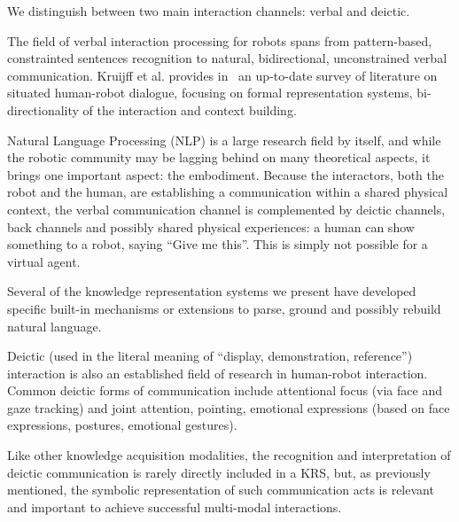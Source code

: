 We distinguish between two main interaction channels: verbal and deictic.

\begin{scriptsize}
\begin{center}
\end{center}
\end{scriptsize}

\label{sect|nlp}

The field of verbal interaction processing for robots spans from pattern-based,
constrainted sentences recognition to natural, bidirectional, unconstrained
verbal communication. Kruijff et al. provides in~\cite{Kruijff2010} an
up-to-date survey of literature on situated human-robot dialogue, focusing on
formal representation systems, bi-directionality of the interaction and context
building.

Natural Language Processing (NLP) is a large research field by itself, and
while the robotic community may be lagging behind on many theoretical aspects,
it brings one important aspect: the embodiment. Because the interactors, both
the robot and the human, are establishing a communication within a shared
physical context, the verbal communication channel is complemented by deictic
channels, back channels and possibly shared physical experiences: a human can
show something to a robot, saying ``Give me this''. This is simply not possible
for a virtual agent.

Several of the knowledge representation systems we present have developed
specific built-in mechanisms or extensions to parse, ground and possibly
rebuild natural language.

Deictic (used in the literal meaning of ``display, demonstration, reference'')
interaction is also an established field of research in human-robot
interaction. Common deictic forms of communication include attentional focus
(via face and gaze tracking) and joint attention, pointing, emotional
expressions (based on face expressions, postures, emotional gestures).

Like other knowledge acquisition modalities, the recognition and interpretation
of deictic communication is rarely directly included in a KRS, but, as
previously mentioned, the symbolic representation of such communication acts is
relevant and important to achieve successful multi-modal interactions.

